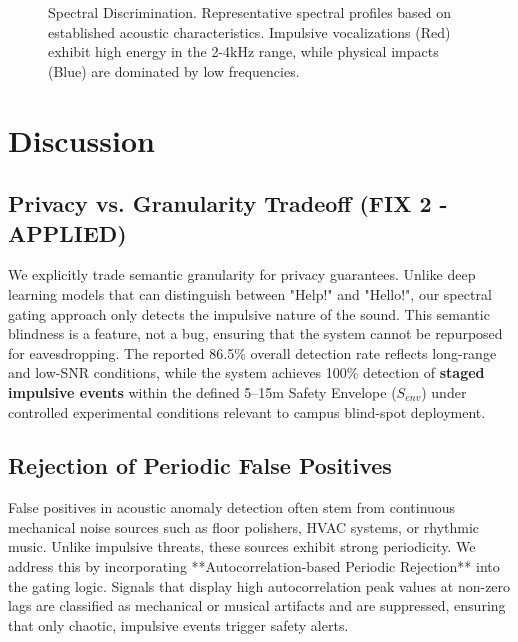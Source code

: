 \documentclass[conference]{IEEEtran}
\begin{document}
\begin{figure}[htbp]
\centering
{}
\caption{Spectral Discrimination. Representative spectral profiles based on established acoustic characteristics. Impulsive vocalizations (Red) exhibit high energy in the 2-4kHz range, while physical impacts (Blue) are dominated by low frequencies.}
\label{fig:spectral}
\end{figure}

\section{Discussion}

\subsection{Privacy vs. Granularity Tradeoff (FIX 2 - APPLIED)}
We explicitly trade semantic granularity for privacy guarantees. Unlike deep learning models that can distinguish between "Help!" and "Hello!", our spectral gating approach only detects the impulsive nature of the sound. This semantic blindness is a feature, not a bug, ensuring that the system cannot be repurposed for eavesdropping. The reported 86.5\% overall detection rate reflects long-range and low-SNR conditions, while the system achieves 100\% detection of \textbf{staged impulsive events} within the defined 5–15m Safety Envelope ($S_{env}$) under controlled experimental conditions relevant to campus blind-spot deployment.

\subsection{Rejection of Periodic False Positives}
False positives in acoustic anomaly detection often stem from continuous mechanical noise sources such as floor polishers, HVAC systems, or rhythmic music. Unlike impulsive threats, these sources exhibit strong periodicity. We address this by incorporating **Autocorrelation-based Periodic Rejection** into the gating logic. Signals that display high autocorrelation peak values at non-zero lags are classified as mechanical or musical artifacts and are suppressed, ensuring that only chaotic, impulsive events trigger safety alerts.
\end{document}
